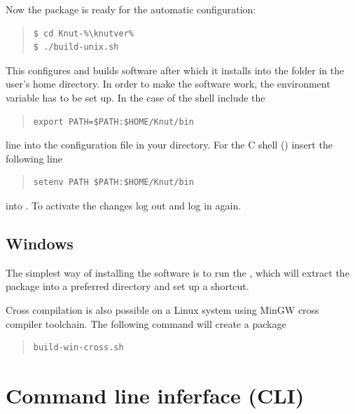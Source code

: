 \documentclass[10pt,a4paper]{ddedoc}
\begin{document}
Now the package is ready for the automatic configuration:
{ \small \begin{quote} \begin{lstlisting}[basicstyle=\tt,frame=single]
$ cd Knut-%\knutver%
$ ./build-unix.sh
\end{lstlisting} \end{quote} } \noindent
This configures and builds software after which it installs into the
 folder in the user's home directory.
In order to make the software work, the  environment variable has
to be set up. In the case of the  shell include the
{ \small \begin{quote} \begin{lstlisting}[basicstyle=\tt,frame=single]
export PATH=$PATH:$HOME/Knut/bin
\end{lstlisting} \end{quote} } \noindent
line into the  configuration file in your 
directory. For the C shell () insert the following line
{ \small \begin{quote} \begin{lstlisting}[basicstyle=\tt,frame=single]
setenv PATH $PATH:$HOME/Knut/bin
\end{lstlisting} \end{quote} } \noindent
into . To activate the changes log out and log in again.

\subsection{Windows}

The simplest way of installing the software is to run the
, which will extract the package into a
preferred directory and set up a  shortcut.

Cross compilation is also possible on a Linux system using MinGW cross compiler toolchain. 
The following command will create a package
{ \small \begin{quote} \begin{lstlisting}[basicstyle=\tt,frame=single]
build-win-cross.sh
\end{lstlisting} \end{quote} } \noindent

\section{Command line inferface (CLI)}
\end{document}
